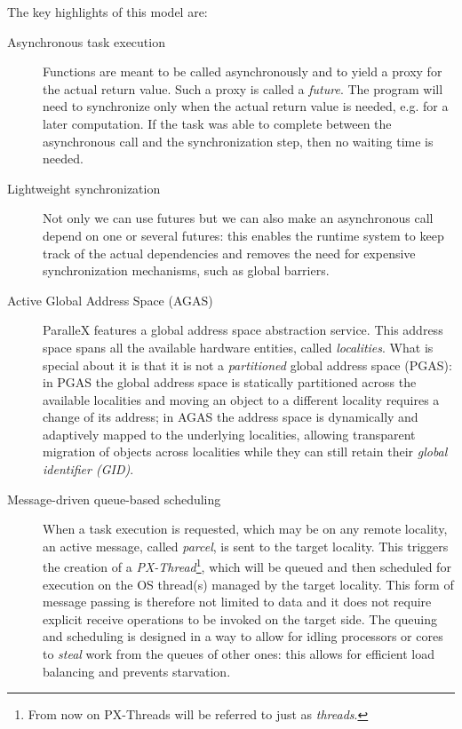 The key highlights of this model are:
\begin{description}
	\item [Asynchronous task execution] Functions are meant to be called asynchronously and to yield a proxy for the actual return value. Such a proxy is called a \emph{future}. The program will need to synchronize only when the actual return value is needed, e.g. for a later computation. If the task was able to complete between the asynchronous call and the synchronization step, then no waiting time is needed.
	\item [Lightweight synchronization] Not only we can use futures but we can also make an asynchronous call depend on one or several futures: this enables the runtime system to keep track of the actual dependencies and removes the need for expensive synchronization mechanisms, such as global barriers.
	\item [Active Global Address Space (AGAS)] ParalleX features a global address space abstraction service. This address space spans all the available hardware entities, called \emph{localities}.
	What is special about it is that it is not a \emph{partitioned} global address space (PGAS): in PGAS the global address space is statically partitioned across the available localities and moving an object to a different locality requires a change of its address; in AGAS the address space is dynamically and adaptively mapped to the underlying localities, allowing transparent migration of objects across localities while they can still retain their \emph{global identifier (GID)}.
	\item [Message-driven queue-based scheduling] When a task execution is requested, which may be on any remote locality, an active message, called \emph{parcel}, is sent to the target locality. This triggers the creation of a \emph{PX-Thread}\footnote{From now on PX-Threads will be referred to just as \emph{threads}.}, which will be queued and then scheduled for execution on the OS thread(s) managed by the target locality. This form of message passing is therefore not limited to data and it does not require explicit receive operations to be invoked on the target side. The queuing and scheduling is designed in a way to allow for idling processors or cores to \emph{steal} work from the queues of other ones: this allows for efficient load balancing and prevents starvation.
\end{description}


